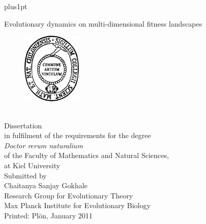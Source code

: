 \documentclass[oneside,11pt,a4paper]{book}
\title{}
\author{
  }
\date{}
\renewcommand{\baselinestretch}{1.1}
\begin{document}

 \renewcommand\baselinestretch{1.4}
\baselineskip=18pt plus1pt


\setcounter{secnumdepth}{2}
\setcounter{tocdepth}{1}

\newpage
 \thispagestyle{empty}
\begin{center}
\Huge{Evolutionary dynamics on multi-dimensional fitness landscapes}
\vspace*{20mm}
\begin{figure}[h]
  \begin{center}
  \includegraphics[width=0.25\textwidth]{Figs_Thesis/mathnat}
  \end{center}
\end{figure}
\\
\large Dissertation\\
in fulfilment of the requirements for the degree\\%
\vspace*{1ex}
\textit{Doctor rerum naturalium}\\
of the Faculty of Mathematics and Natural Sciences,\\
at Kiel University\\
\vspace*{1ex}
\vspace*{15mm}
\large Submitted by\\
Chaitanya Sanjay Gokhale\\
\large \vspace*{1ex}
Research Group for Evolutionary Theory\\
Max Planck Institute for Evolutionary Biology\\
\vspace*{2ex}
 \textsf{Printed: Pl\"{o}n, January 2011}
\end{center}
\end{document}
